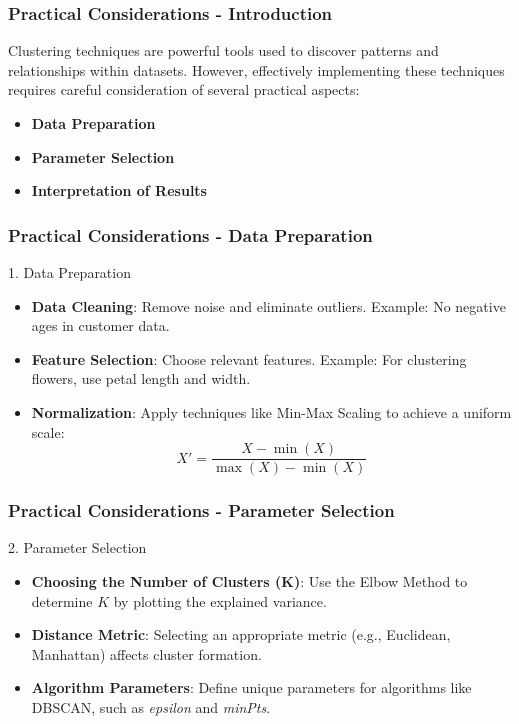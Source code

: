 \documentclass[aspectratio=169]{beamer}
\begin{document}
\begin{frame}[fragile]
    \frametitle{Practical Considerations - Introduction}
    Clustering techniques are powerful tools used to discover patterns and relationships within datasets. However, effectively implementing these techniques requires careful consideration of several practical aspects:
    \begin{itemize}
        \item \textbf{Data Preparation}
        \item \textbf{Parameter Selection}
        \item \textbf{Interpretation of Results}
    \end{itemize}
\end{frame}

\begin{frame}[fragile]
    \frametitle{Practical Considerations - Data Preparation}
    \begin{block}{1. Data Preparation}
        \begin{itemize}
            \item \textbf{Data Cleaning}: Remove noise and eliminate outliers. Example: No negative ages in customer data.
            \item \textbf{Feature Selection}: Choose relevant features. Example: For clustering flowers, use petal length and width.
            \item \textbf{Normalization}: Apply techniques like Min-Max Scaling to achieve a uniform scale:
            \begin{equation}
            X' = \frac{X - \min(X)}{\max(X) - \min(X)}
            \end{equation}
        \end{itemize}
    \end{block}
\end{frame}

\begin{frame}[fragile]
    \frametitle{Practical Considerations - Parameter Selection}
    \begin{block}{2. Parameter Selection}
        \begin{itemize}
            \item \textbf{Choosing the Number of Clusters (K)}: Use the Elbow Method to determine \( K \) by plotting the explained variance.
            \item \textbf{Distance Metric}: Selecting an appropriate metric (e.g., Euclidean, Manhattan) affects cluster formation.
            \item \textbf{Algorithm Parameters}: Define unique parameters for algorithms like DBSCAN, such as \textit{epsilon} and \textit{minPts}.
        \end{itemize}
    \end{block}
\end{frame}
\end{document}
